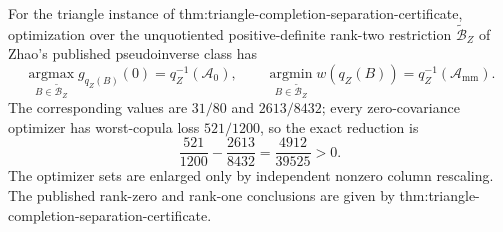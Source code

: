 For the triangle instance of thm:triangle-completion-separation-certificate, optimization over the unquotiented positive-definite rank-two restriction \(\widetilde{\mathcal B}_Z\) of Zhao's published pseudoinverse class has
\[
\operatorname*{argmax}_{B\in\widetilde{\mathcal B}_Z}g_{q_Z(B)}(0)=q_Z^{-1}(\mathcal A_0),
\qquad
\operatorname*{argmin}_{B\in\widetilde{\mathcal B}_Z}w(q_Z(B))=q_Z^{-1}(\mathcal A_{\mathrm{mm}}).
\]
The corresponding values are \(31/80\) and \(2613/8432\); every zero-covariance optimizer has worst-copula loss \(521/1200\), so the exact reduction is
\[
\frac{521}{1200}-\frac{2613}{8432}=\frac{4912}{39525}>0.
\]
The optimizer sets are enlarged only by independent nonzero column rescaling.  The published rank-zero and rank-one conclusions are given by thm:triangle-completion-separation-certificate.